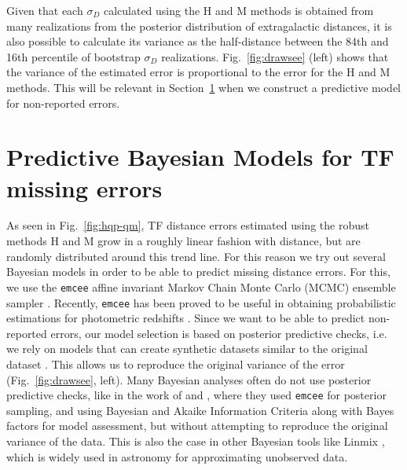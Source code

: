 \documentclass[a4paper,fleqn,usenatbib]{mnras}
\begin{document}
Given that each $\sigma_D$ calculated using the H and M methods is obtained from many realizations from the posterior distribution of extragalactic distances, it is also possible to calculate its variance as the half-distance between the 84th and 16th percentile of bootstrap $\sigma_D$ realizations. Fig.~\ref{fig:drawsee} (left) shows that the variance of the estimated error is proportional to the error for the H and M methods. This will be relevant in Section~\ref{sec:predbay} when we construct a predictive model for non-reported errors.

\section{Predictive Bayesian Models for TF missing errors}
\label{sec:predbay} 

As seen in Fig.~\ref{fig:hqp-qm}, TF distance errors estimated using the robust methods H and M grow in a roughly linear fashion with distance, but are randomly distributed around this trend line. For this reason we try out several Bayesian models in order to be able to predict missing distance errors. For this, we use the \texttt{emcee} affine invariant Markov Chain Monte Carlo (MCMC) ensemble sampler \citep{emcee}. Recently, \texttt{emcee} has been proved to be useful in obtaining probabilistic estimations for photometric redshifts \citet{photred1,photred2}. Since we want to be able to predict non-reported errors, our model selection is based on posterior predictive checks, i.e. we rely on models that can create synthetic datasets similar to the original dataset \citep{gelmanppd}. This allows us to reproduce the original variance of the error (Fig.~\ref{fig:drawsee}, left). Many Bayesian analyses often do not use posterior predictive checks, like in the work of \citet{propprob2018} and \citet{bayesh}, where they used \texttt{emcee} for posterior sampling, and using Bayesian and Akaike Information Criteria along with Bayes factors for model assessment, but without attempting to reproduce the original variance of the data. This is also the case in other Bayesian tools like Linmix  \citep{gmastro}, which is widely used in astronomy for approximating unobserved data.  \\
\end{document}
